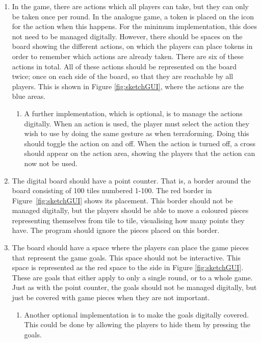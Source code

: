 \begin{enumerate}
\item In the game, there are actions which all players can take, but they can only be taken once per round. In the analogue game, a token is placed on the icon for the action when this happens. For the minimum implementation, this does not need to be managed digitally. However, there should be spaces on the board showing the different actions, on which the players can place tokens in order to remember which actions are already taken. There are six of these actions in total. All of these actions should be represented on the board twice; once on each side of the board, so that they are reachable by all players. This is shown in Figure \ref{fig:sketchGUI}, where the actions are the blue areas. 
	\begin{enumerate}
	\item A further implementation, which is optional, is to manage the actions digitally. When an action is used, the player must select the action they wish to use by doing the same gesture as when terraforming. Doing this should toggle the action on and off. When the action is turned off, a cross should appear on the action area, showing the players that the action can now not be used.
	\end{enumerate}
\item The digital board should have a point counter. That is, a border around the board consisting of 100 tiles numbered 1-100. The red border in Figure~\ref{fig:sketchGUI} shows its placement. This border should not be managed digitally, but the players should be able to move a coloured pieces representing themselves from tile to tile, visualising how many points they have. The program should ignore the pieces placed on this border.
\item The board should have a space where the players can place the game pieces that represent the game goals. This space should not be interactive. This space is represented as the red space to the side in Figure \ref{fig:sketchGUI}. These are goals that either apply to only a single round, or to a whole game. Just as with the point counter, the goals should not be managed digitally, but just be covered with game pieces when they are not important.
	\begin{enumerate}
	\item Another optional implementation is to make the goals digitally covered. This could be done by allowing the players to hide them by pressing the goals.
	\end{enumerate}
\end{enumerate}